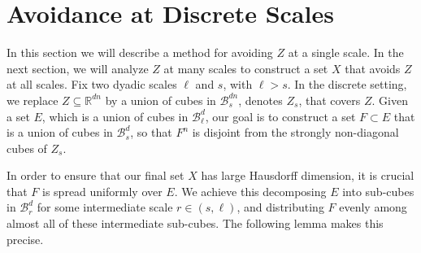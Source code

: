 \documentclass[usenames,dvipsnames,letterpaper, reqno,11pt]{article}
\theoremstyle{plain}
\theoremstyle{plain}
\begin{document}
\section{Avoidance at Discrete Scales}\label{sinceScaleSection}
In this section we will describe a method for avoiding $Z$ at a single scale. In the next section, we will analyze $Z$ at many scales to construct a set $X$ that avoids $Z$ at all scales. Fix two dyadic scales $\ell$ and $s$, with $\ell > s$. In the discrete setting, we replace $Z \subseteq \mathbb R^{dn}$ by a union of cubes in $\mathcal B_s^{dn}$, denotes $Z_s$, that covers $Z$. Given a set $E$, which is a union of cubes in $\mathcal B_{\ell}^d$, our goal is to construct a set $F \subset E$ that is a union of cubes in $\mathcal B_s^{d}$, so that $F^n$ is disjoint from the strongly non-diagonal cubes of $Z_s$.

In order to ensure that our final set $X$ has large Hausdorff dimension, it is crucial that $F$ is spread uniformly over $E$. We achieve this decomposing $E$ into sub-cubes in $\mathcal B_r^{d}$ for some intermediate scale $r \in (s, \ell)$, and distributing $F$ evenly among almost all of these intermediate sub-cubes. The following lemma makes this precise. 
\end{document}
